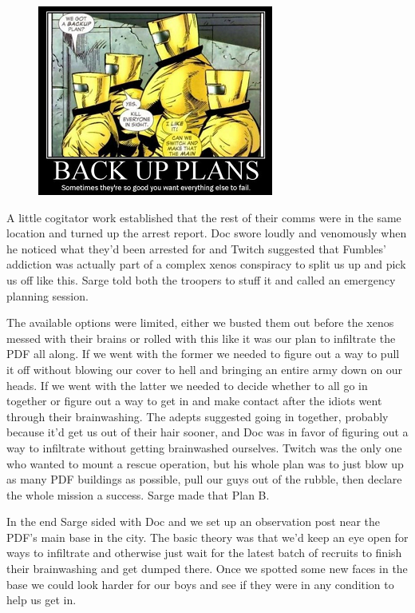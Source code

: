 \begin{figure}
	\begin{center}
		\includegraphics[width=\figwidth]{pics/10/42.png}
	\end{center}
\end{figure}
A little cogitator work established that the rest of their comms were in the same location and turned up the arrest report. 
Doc swore loudly and venomously when he noticed what they'd been arrested for and Twitch suggested that Fumbles' addiction was actually part of a complex xenos conspiracy to split us up and pick us off like this. 
Sarge told both the troopers to stuff it and called an emergency planning session. 


The available options were limited, either we busted them out before the xenos messed with their brains or rolled with this like it was our plan to infiltrate the PDF all along. 
If we went with the former we needed to figure out a way to pull it off without blowing our cover to hell and bringing an entire army down on our heads. 
If we went with the latter we needed to decide whether to all go in together or figure out a way to get in and make contact after the idiots went through their brainwashing. 
The adepts suggested going in together, probably because it'd get us out of their hair sooner, and Doc was in favor of figuring out a way to infiltrate without getting brainwashed ourselves. 
Twitch was the only one who wanted to mount a rescue operation, but his whole plan was to just blow up as many PDF buildings as possible, pull our guys out of the rubble, then declare the whole mission a success. 
Sarge made that Plan B.

In the end Sarge sided with Doc and we set up an observation post near the PDF's main base in the city. 
The basic theory was that we'd keep an eye open for ways to infiltrate and otherwise just wait for the latest batch of recruits to finish their brainwashing and get dumped there. 
Once we spotted some new faces in the base we could look harder for our boys and see if they were in any condition to help us get in. 


